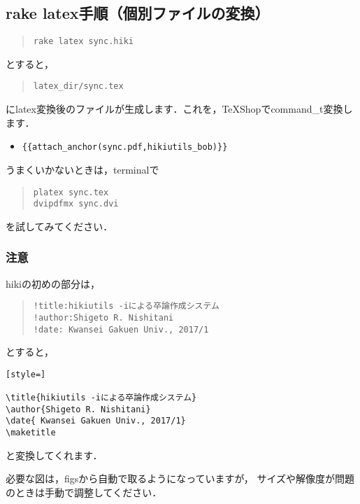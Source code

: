 \subsection{rake latex手順（個別ファイルの変換）}\begin{quote}\begin{verbatim}
rake latex sync.hiki
\end{verbatim}\end{quote}
とすると，
\begin{quote}\begin{verbatim}
latex_dir/sync.tex
\end{verbatim}\end{quote}
にlatex変換後のファイルが生成します．これを，TeXShopでcommand\_t変換します．
\begin{itemize}
\item \verb|{{attach_anchor(sync.pdf,hikiutils_bob)}}|
\end{itemize}
うまくいかないときは，terminalで
\begin{quote}\begin{verbatim}
platex sync.tex
dvipdfmx sync.dvi
\end{verbatim}\end{quote}
を試してみてください．

\subsubsection{注意}
hikiの初めの部分は，
\begin{quote}\begin{verbatim}
!title:hikiutils -iによる卒論作成システム
!author:Shigeto R. Nishitani
!date: Kwansei Gakuen Univ., 2017/1
\end{verbatim}\end{quote}
とすると，
\begin{lstlisting}[style=]

\title{hikiutils -iによる卒論作成システム}
\author{Shigeto R. Nishitani}
\date{ Kwansei Gakuen Univ., 2017/1}
\maketitle
\end{lstlisting}
と変換してくれます．

必要な図は，figsから自動で取るようになっていますが，
サイズや解像度が問題のときは手動で調整してください．

